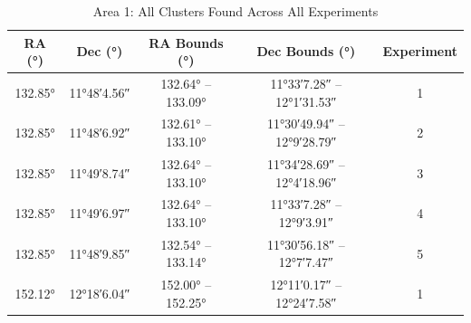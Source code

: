 \begin{longtable}{c c c c c}
    \caption{Area 1: All Clusters Found Across All Experiments} \label{tb:results-raw-a1}                                                                                                                                                                                                \\

    \toprule
    RA (°)                                 & Dec (°)                                      & RA Bounds (°)                                                                    & Dec Bounds (°)                                                                               & Experiment \\
    \midrule
    \ang[minimum-integer-digits=2]{132.85} & \ang[minimum-integer-digits=2]{+11;48;4.56}  & \ang[minimum-integer-digits=2]{132.64} -- \ang[minimum-integer-digits=2]{133.09} & \ang[minimum-integer-digits=2]{+11;33;7.28} -- \ang[minimum-integer-digits=2]{+12;1;31.53}   & 1          \\ %
    \ang[minimum-integer-digits=2]{132.85} & \ang[minimum-integer-digits=2]{+11;48;6.92}  & \ang[minimum-integer-digits=2]{132.61} -- \ang[minimum-integer-digits=2]{133.10} & \ang[minimum-integer-digits=2]{+11;30;49.94} -- \ang[minimum-integer-digits=2]{+12;9;28.79}  & 2          \\ %
    \ang[minimum-integer-digits=2]{132.85} & \ang[minimum-integer-digits=2]{+11;49;8.74}  & \ang[minimum-integer-digits=2]{132.64} -- \ang[minimum-integer-digits=2]{133.10} & \ang[minimum-integer-digits=2]{+11;34;28.69} -- \ang[minimum-integer-digits=2]{+12;4;18.96}  & 3          \\ %
    \ang[minimum-integer-digits=2]{132.85} & \ang[minimum-integer-digits=2]{+11;49;6.97}  & \ang[minimum-integer-digits=2]{132.64} -- \ang[minimum-integer-digits=2]{133.10} & \ang[minimum-integer-digits=2]{+11;33;7.28} -- \ang[minimum-integer-digits=2]{+12;9;3.91}    & 4          \\ %
    \ang[minimum-integer-digits=2]{132.85} & \ang[minimum-integer-digits=2]{+11;48;9.85}  & \ang[minimum-integer-digits=2]{132.54} -- \ang[minimum-integer-digits=2]{133.14} & \ang[minimum-integer-digits=2]{+11;30;56.18} -- \ang[minimum-integer-digits=2]{+12;7;7.47}   & 5          \\ %
    \ang[minimum-integer-digits=2]{152.12} & \ang[minimum-integer-digits=2]{+12;18;6.04}  & \ang[minimum-integer-digits=2]{152.00} -- \ang[minimum-integer-digits=2]{152.25} & \ang[minimum-integer-digits=2]{+12;11;0.17} -- \ang[minimum-integer-digits=2]{+12;24;7.58}   & 1          \\ %

\end{longtable}
